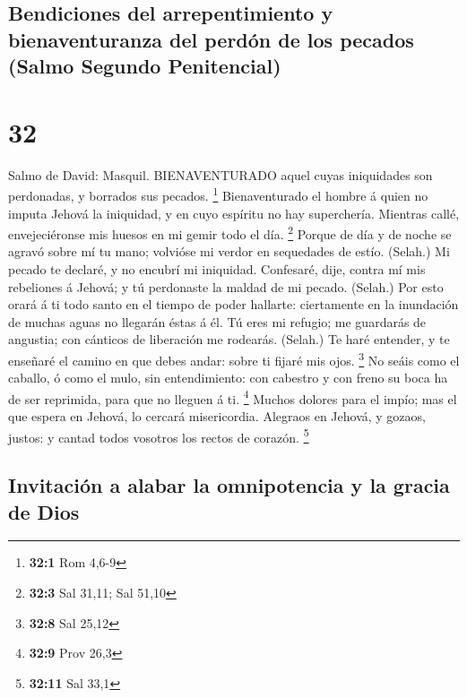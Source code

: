 \hypertarget{bendiciones-del-arrepentimiento-y-bienaventuranza-del-perduxf3n-de-los-pecados-salmo-segundo-penitencial}{%
\subsection{Bendiciones del arrepentimiento y bienaventuranza del perdón
de los pecados (Salmo Segundo
Penitencial)}\label{bendiciones-del-arrepentimiento-y-bienaventuranza-del-perduxf3n-de-los-pecados-salmo-segundo-penitencial}}

\hypertarget{section-31}{%
\section{32}\label{section-31}}

 Salmo de David: Masquil. BIENAVENTURADO aquel cuyas
iniquidades son perdonadas, y borrados sus pecados. \footnote{\textbf{32:1}
  Rom 4,6-9}  Bienaventurado el hombre á quien no imputa
Jehová la iniquidad, y en cuyo espíritu no hay superchería. 
Mientras callé, envejeciéronse mis huesos en mi gemir todo el día.
\footnote{\textbf{32:3} Sal 31,11; Sal 51,10}  Porque de día
y de noche se agravó sobre mí tu mano; volvióse mi verdor en sequedades
de estío. (Selah.)  Mi pecado te declaré, y no encubrí mi
iniquidad. Confesaré, dije, contra mí mis rebeliones á Jehová; y tú
perdonaste la maldad de mi pecado. (Selah.)  Por esto orará
á ti todo santo en el tiempo de poder hallarte: ciertamente en la
inundación de muchas aguas no llegarán éstas á él.  Tú eres
mi refugio; me guardarás de angustia; con cánticos de liberación me
rodearás. (Selah.)  Te haré entender, y te enseñaré el
camino en que debes andar: sobre ti fijaré mis ojos. \footnote{\textbf{32:8}
  Sal 25,12}  No seáis como el caballo, ó como el mulo, sin
entendimiento: con cabestro y con freno su boca ha de ser reprimida,
para que no lleguen á ti. \footnote{\textbf{32:9} Prov 26,3}
 Muchos dolores para el impío; mas el que espera en Jehová,
lo cercará misericordia.  Alegraos en Jehová, y gozaos,
justos: y cantad todos vosotros los rectos de corazón. \footnote{\textbf{32:11}
  Sal 33,1}

\hypertarget{invitaciuxf3n-a-alabar-la-omnipotencia-y-la-gracia-de-dios}{%
\subsection{Invitación a alabar la omnipotencia y la gracia de
Dios}\label{invitaciuxf3n-a-alabar-la-omnipotencia-y-la-gracia-de-dios}}

